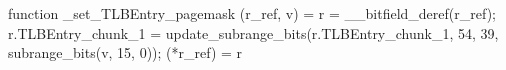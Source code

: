 function _set_TLBEntry_pagemask (r_ref, v) = {
    r = __bitfield_deref(r_ref);
    r.TLBEntry_chunk_1 = update_subrange_bits(r.TLBEntry_chunk_1, 54, 39, subrange_bits(v, 15, 0));
    (*r_ref) = r
}
